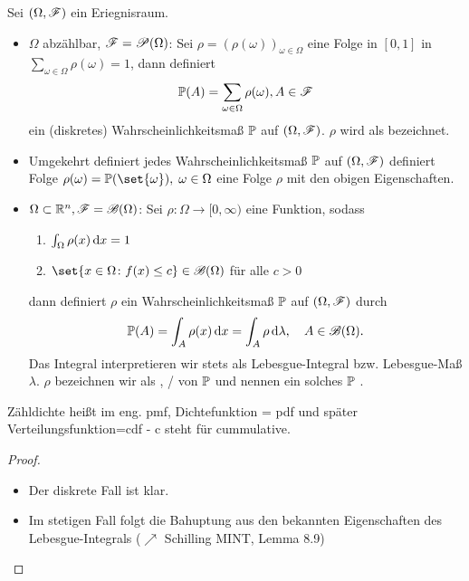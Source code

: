 \begin{proposition}
	Sei $(\Omega, \mathscr{F})$ ein Eriegnisraum.
	\begin{itemize}
		\item $\Omega$ abzählbar, $\mathscr{F} = \mathscr{P}(\Omega)$: Sei $\rho = (\rho(\omega))_{\omega \in \Omega}$ eine Folge in $[0,1]$ in $\sum_{\omega \in \Omega} \rho(\omega) = 1$, dann definiert
		\begin{align}
			\mathbb{P}(A) = \sum_{\omega \in \Omega} \rho(\omega), A \in \mathscr{F} \notag
		\end{align}
		ein (diskretes) Wahrscheinlichkeitsmaß $\mathbb{P}$ auf $(\Omega, \mathscr{F})$. $\rho$ wird als  bezeichnet.
		\item Umgekehrt definiert jedes Wahrscheinlichkeitsmaß $\mathbb{P}$ auf $(\Omega, \mathscr{F})$ definiert Folge $\rho(\omega) = \probp(\set{\omega}),\; \omega \in \Omega$ eine Folge $\rho$ mit den obigen Eigenschaften.
		\item $\Omega \subset \mathbb{R}^n, \mathscr{F} = \mathscr{B}(\Omega)$: Sei $\rho: \Omega \to [0, \infty)$ eine Funktion, sodass
		\begin{enumerate}
			\item $\int_{\Omega} \rho(x)\,\mathrm{d} x = 1$
			\item $\set{x \in \Omega \colon f(x) \le c} \in \borel(\Omega)$ für alle $c > 0$ 
		\end{enumerate}
		dann definiert $\rho$ ein Wahrscheinlichkeitsmaß $\mathbb{P}$ auf $(\Omega, \mathscr{F})$ durch 
		\begin{align}
		\mathbb{P}(A) = \int_{A} \rho(x) \,\mathrm{d} x = \int_{A} \rho \,\mathrm{d} \lambda, \quad A \in \mathscr{B}(\Omega).\notag
		\end{align}
		Das Integral interpretieren wir stets als Lebesgue-Integral bzw. Lebesgue-Maß $\lambda$.
		$\rho$ bezeichnen wir als , / von $\mathbb{P}$ und nennen ein solches $\mathbb{P}$ .
	\end{itemize}
\end{proposition}
\begin{*anmerkung}[English]
Zähldichte heißt im eng. pmf, Dichtefunktion = pdf und später Verteilungsfunktion=cdf - c steht für cummulative.
\end{*anmerkung}

\begin{proof}
	\begin{itemize}
		\item Der diskrete Fall ist klar.
		\item Im stetigen Fall folgt die Bahuptung aus den bekannten Eigenschaften des Lebesgue-Integrals ($\nearrow$ Schilling MINT, Lemma 8.9)
	\end{itemize}
\end{proof}

